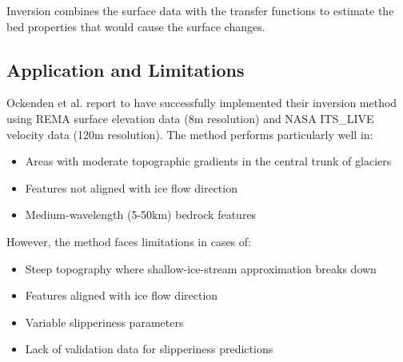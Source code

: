 Inversion combines the surface data with the transfer functions to estimate the bed properties that would cause the surface changes.

\subsection*{Application and Limitations}

Ockenden et al. report to have successfully implemented their inversion method using REMA surface elevation data (8m resolution) and NASA ITS\_LIVE velocity data (120m resolution). The method performs particularly well in:
\begin{itemize}
\item Areas with moderate topographic gradients in the central trunk of glaciers
\item Features not aligned with ice flow direction
\item Medium-wavelength (5-50km) bedrock features
\end{itemize}
However, the method faces limitations in cases of:
\begin{itemize}
\item Steep topography where shallow-ice-stream approximation breaks down
\item Features aligned with ice flow direction
\item Variable slipperiness parameters
\item Lack of validation data for slipperiness predictions
\end{itemize}



